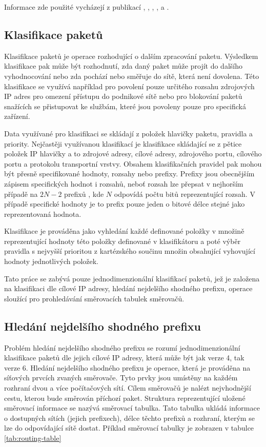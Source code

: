 Informace zde použité vycházejí z publikací \cite{bspl}, \cite{tbm}, \cite{aho}, \cite{gigabit-networking}, \cite{phe-design} a \cite{meduna}.

\subsection{Klasifikace paketů}

Klasifikace paketů je operace rozhodující o dalším zpracování paketu.
Výsledkem klasifikace pak může být rozhodnutí, zda daný paket může projít do
dalšího vyhodnocování nebo zda pochází nebo směřuje do sítě, která není dovolena.
Této klasifikace se využívá například pro povolení pouze určitého rozsahu zdrojových IP adres
pro omezení přístupu do podnikové sítě nebo pro blokování paketů snažících se přistupovat
ke službám, které jsou povoleny pouze pro specifická zařízení.

Data využívané pro klasifikaci se skládají z položek hlavičky paketu, pravidla a priority.
Nejčastěji využívanou klasifikací je klasifikace skládající se z pětice položek IP hlavičky
a to zdrojové adresy, cílové adresy, zdrojového portu, cílového portu a protokolu transportní vrstvy.
Obsahem klasifikačních pravidel pak mohou být přesně specifikované hodnoty, rozsahy nebo prefixy.
Prefixy jsou obecnějším zápisem specifických hodnot i rozsahů, neboť rozsah lze přepsat v nejhorším
případě na $2N - 2$ prefixů \cite{clasification-prefix}, kde $N$ odpovídá počtu bitů reprezentující rozsah. V případě specifické hodnoty je to prefix pouze jeden o bitové délce stejné jako reprezentovaná hodnota.

Klasifikace je prováděna jako vyhledání každé definované položky v množině reprezentující hodnoty
této položky definované v klasifikátoru a poté výběr pravidla s nejvyšší prioritou z kartézského součinu množin
obsahující vyhovující hodnoty jednotlivých položek.

Tato práce se zabývá pouze jednodimenzionální klasifikací paketů, jež je založena na klasifikaci dle cílové IP
adresy, hledání nejdelšího shodného prefixu, operace sloužící pro prohledávání směrovacích tabulek směrovačů.

\subsection{Hledání nejdelšího shodného prefixu}\label{section:lpm} %
Problém hledání nejdelšího shodného prefixu se rozumí jednodimenzionální klasifikace paketů dle
jejich cílové IP adresy, která může být jak verze 4, tak verze 6.
Hledání nejdelšího shodného prefixu je operace, která je prováděna
na síťových prvcích zvaných směrovače. Tyto prvky jsou umístěny na každém rozhraní dvou a více
počítačových sítí. Cílem směrovačů je nalézt nejvhodnější cestu, kterou bude směrován příchozí paket.
Struktura reprezentující uložené směrovací informace se nazývá směrovací tabulka.
Tato tabulka ukládá informace o dostupných sítích (jejich prefixech), délce těchto prefixů a rozhraní,
kterým se lze do odpovídající sítě dostat. Příklad směrovací tabulky je zobrazen v tabulce \ref{tab:routing-table}

